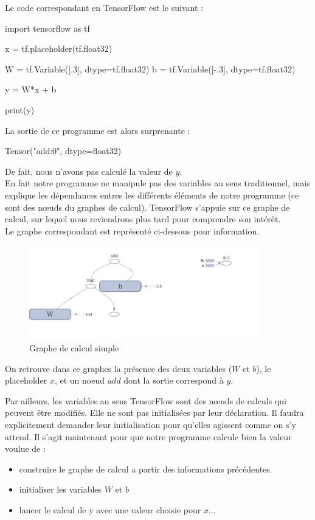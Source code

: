 \documentclass[a4paper,11pt]{book}
\begin{document}
Le code correspondant en TensorFlow est le suivant :
\begin{mypython}
import tensorflow as tf

x = tf.placeholder(tf.float32)

W = tf.Variable([.3], dtype=tf.float32)
b = tf.Variable([-.3], dtype=tf.float32)

y = W*x + b

print(y)
\end{mypython}

La sortie de ce programme est alors surprenante :
\begin{myoutput}
Tensor("add:0", dtype=float32)
\end{myoutput}

De fait, nous n'avons pas calculé la valeur de $y$.\\
En fait notre programme ne manipule pas des variables au sens traditionnel, mais explique les dépendances entres les différents éléments de notre programme (ce sont des nœuds du graphes de calcul). TensorFlow s'appuie sur ce graphe de calcul, sur lequel nous reviendrons plus tard pour comprendre son intérêt.\\

Le graphe correspondant est représenté ci-dessous pour information.
\begin{figure}[H]

\begin{center}
\includegraphics[width=10cm]{./figures/graphAddition.png} 
\end{center}
\caption{Graphe de calcul simple}
\end{figure}

On retrouve dans ce graphes la présence des deux variables ($W$ et $b$), le placeholder $x$, et un noeud $add$ dont la sortie correspond à $y$.


Par ailleurs, les variables au sens TensorFlow sont des nœuds de calculs qui peuvent être modifiés. Elle ne sont pas initialisées par leur déclaration. Il faudra explicitement demander leur initialisation pour qu'elles agissent comme on s'y attend.
Il s'agit maintenant pour que notre programme calcule bien la valeur voulue de :
\begin{itemize}
\item construire le graphe de calcul a partir des informations précédentes.
\item initialiser les variables $W$ et $b$
\item lancer le calcul de y avec une valeur choisie pour $x$...
\end{itemize}
\end{document}
